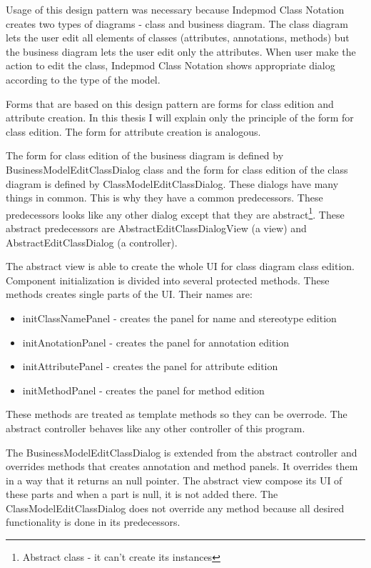 Usage of this design pattern was necessary because Indepmod Class Notation creates two types of diagrams - class and business diagram. The class diagram lets the user edit all elements of classes (attributes, annotations, methods) but the business diagram lets the user edit only the attributes. When user make the action to edit the class, Indepmod Class Notation shows appropriate dialog according to the type of the model.

Forms that are based on this design pattern are forms for class edition and attribute creation. In this thesis I will explain only the principle of the form for class edition. The form for attribute creation is analogous.

The form for class edition of the business diagram is defined by BusinessModelEditClassDialog class and the form for class edition of the class diagram is defined by ClassModelEditClassDialog. These dialogs have many things in common. This is why they have a common predecessors. These predecessors looks like any other dialog except that they are abstract\footnote{Abstract class - it can't create its instances}. These abstract predecessors are AbstractEditClassDialogView (a view) and AbstractEditClassDialog (a controller). 

The abstract view is able to create the whole UI for class diagram class edition. Component initialization is divided into several protected methods. These methods creates single parts of the UI. Their names are: 

\begin{itemize}
    \item initClassNamePanel - creates the panel for name and stereotype edition
    \item initAnotationPanel - creates the panel for annotation edition
    \item initAttributePanel - creates the panel for attribute edition
    \item initMethodPanel - creates the panel for method edition
\end{itemize}

These methods are treated as template methods so they can be overrode. The abstract controller behaves like any other controller of this program.

The BusinessModelEditClassDialog is extended from the abstract controller and overrides methods that creates annotation and method panels. It overrides them in a way that it returns an null pointer. The abstract view compose its UI of these parts and when a part is null, it is not added there. The ClassModelEditClassDialog does not override any method because all desired functionality is done in its predecessors.

